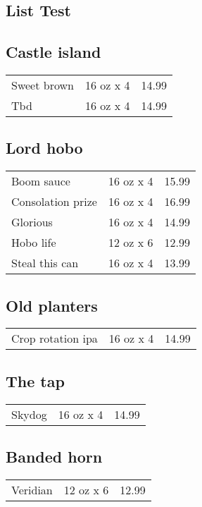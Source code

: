 \documentclass{article}%
\begin{document}
%
\pagestyle{empty}%
\normalsize%
%
\setlength{\columnseprule}{0.5pt}%
\setlength{\columnsep}{1cm}%
\renewcommand{\familydefault}{\sfdefault}%
\sffamily%
\begin{multicols}{3}%
\section*{\selectfont List Test}%

%
\subsection*{Castle island}%
\begin{tabular}{l c r}%
Sweet brown&16 oz x 4&14.99\\%
Tbd&16 oz x 4&14.99\\%
\end{tabular}

%
\subsection*{Lord hobo}%
\begin{tabular}{l c r}%
Boom sauce&16 oz x 4&15.99\\%
Consolation prize&16 oz x 4&16.99\\%
Glorious&16 oz x 4&14.99\\%
Hobo life&12 oz x 6&12.99\\%
Steal this can&16 oz x 4&13.99\\%
\end{tabular}

%
\subsection*{Old planters}%
\begin{tabular}{l c r}%
Crop rotation ipa&16 oz x 4&14.99\\%
\end{tabular}

%
\subsection*{The tap}%
\begin{tabular}{l c r}%
Skydog&16 oz x 4&14.99\\%
\end{tabular}

%
\subsection*{Banded horn}%
\begin{tabular}{l c r}%
Veridian&12 oz x 6&12.99\\%
\end{tabular}


\end{multicols}
\end{document}
